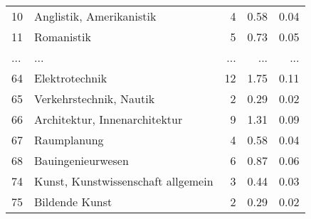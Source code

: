 \begin{longtable}{lXrrr}
        10 & \multicolumn{1}{X}{Anglistik, Amerikanistik} & %
          \num{4} &
          \num[round-mode=places,round-precision=2]{0.58} &
          \num[round-mode=places,round-precision=2]{0.04} \\
        11 & \multicolumn{1}{X}{Romanistik} & %
          \num{5} &
          \num[round-mode=places,round-precision=2]{0.73} &
          \num[round-mode=places,round-precision=2]{0.05} \\
       ... & ... & ... & ... & ... \\
        64 & \multicolumn{1}{X}{Elektrotechnik} & %
          \num{12} &
          \num[round-mode=places,round-precision=2]{1.75} &
          \num[round-mode=places,round-precision=2]{0.11} \\

        65 & \multicolumn{1}{X}{Verkehrstechnik, Nautik} & %
          \num{2} &
          \num[round-mode=places,round-precision=2]{0.29} &
          \num[round-mode=places,round-precision=2]{0.02} \\

        66 & \multicolumn{1}{X}{Architektur, Innenarchitektur} & %
          \num{9} &
          \num[round-mode=places,round-precision=2]{1.31} &
          \num[round-mode=places,round-precision=2]{0.09} \\

        67 & \multicolumn{1}{X}{Raumplanung} & %
          \num{4} &
          \num[round-mode=places,round-precision=2]{0.58} &
          \num[round-mode=places,round-precision=2]{0.04} \\

        68 & \multicolumn{1}{X}{Bauingenieurwesen} & %
          \num{6} &
          \num[round-mode=places,round-precision=2]{0.87} &
          \num[round-mode=places,round-precision=2]{0.06} \\

        74 & \multicolumn{1}{X}{Kunst, Kunstwissenschaft allgemein} & %
          \num{3} &
          \num[round-mode=places,round-precision=2]{0.44} &
          \num[round-mode=places,round-precision=2]{0.03} \\

        75 & \multicolumn{1}{X}{Bildende Kunst} & %
          \num{2} &
          \num[round-mode=places,round-precision=2]{0.29} &
          \num[round-mode=places,round-precision=2]{0.02} \\


\end{longtable}
